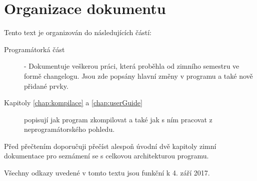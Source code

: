 
\chapter*{Organizace dokumentu}

Tento text je organizován do následujících částí:
\begin{description}
	\item[Programátorká část] - Dokumentuje veškerou práci, která proběhla od zimního semestru ve formě changelogu. Jsou zde popsány hlavní změny v programu a také nově přidané prvky. 
	\item[Kapitoly \ref{chap:kompilace} a \ref{chap:userGuide}] popisují jak program zkompilovat a také jak s ním pracovat z neprogramátorského pohledu.
\end{description}

Před přečtením doporučuji přečíst alespoň úvodní dvě kapitoly zimní dokumentace pro seznámení se s celkovou architekturou programu.

Všechny odkazy uvedené v tomto textu jsou funkční k 4. září 2017.
